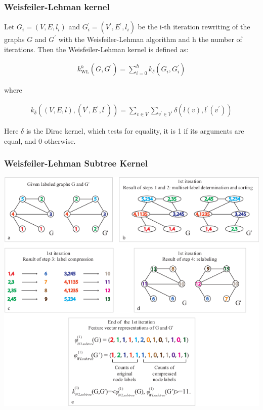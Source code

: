 \documentclass{beamer}
\begin{document}

\begingroup
\small
\begin{frame}
\frametitle{Weisfeiler-Lehman kernel}

\begin{definition}
Let $G_i = (V, E, l_i)$ and $G_i^\prime = (V^\prime , E^\prime , l_i)$ be the i-th iteration rewriting of the graphs $G$ and $G^\prime$ with the Weisfeiler-Lehman algorithm and h the number of iterations. Then the Weisfeiler-Lehman kernel is defined as:

\begin{align}
k_{\mathrm{WL}}^{h}\left(G, G^\prime\right)=\sum_{i=0}^h k_\delta\left(G_i, G_i^\prime\right)
\end{align}

where

\begin{align}
k_\delta\left((V, E, l),\left(V^\prime, E^\prime, l^\prime\right)\right)=\sum_{v \in V} \sum_{v^{\prime} \in V^{\prime}} \delta\left(l(v), l^{\prime}\left(v^{\prime}\right)\right)
\end{align}

Here $\delta$ is the Dirac kernel, which tests for equality, it is 1 if its arguments are equal, and 0 otherwise.
\end{definition}

\end{frame}
\endgroup


\begin{frame}
\frametitle{Weisfeiler-Lehman Subtree Kernel}

\begin{center}
\begin{figure}
\end{figure}
\includegraphics[width=\textwidth,height=0.8\textheight,keepaspectratio]{img/wl_iteration_total.png}
\end{center}

\end{frame}
\end{document}
